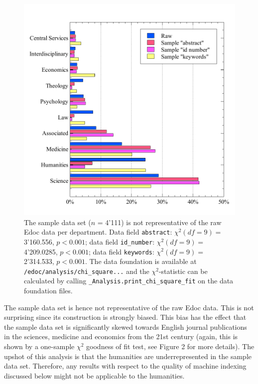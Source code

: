 \begin{figure}
\centering
\includegraphics{images/chi_square_selection_fields.pdf}
\caption{The sample data set (\(n\) = 4'111) is not representative of
the raw Edoc data per department. Data field \texttt{abstract}:
\(\chi^2 (df=9) =\) 3'160.556, \(p < 0.001\); data field
\texttt{id\_number}: \(\chi^2 (df=9) =\) 4'209.0285, \(p < 0.001\); data
field \texttt{keywords}: \(\chi^2 (df=9) =\) 2'314.533, \(p < 0.001\).
The data foundation is available at
\texttt{/edoc/analysis/chi\_square...} and the \(\chi^2\)-statistic can
be calculated by calling \texttt{\_Analysis.print\_chi\_square\_fit} on
the data foundation files.}
\end{figure}

The sample data set is hence not representative of the raw Edoc data.
This is not surprising since its construction is strongly biased. This
bias has the effect that the sample data set is significantly skewed
towards English journal publications in the sciences, medicine and
economics from the 21st century (again, this is shown by a one-sample
\(\chi^2\) goodness of fit test, see Figure 2 for more details). The
upshot of this analysis is that the humanities are underrepresented in
the sample data set. Therefore, any results with respect to the quality
of machine indexing discussed below might not be applicable to the
humanities.

